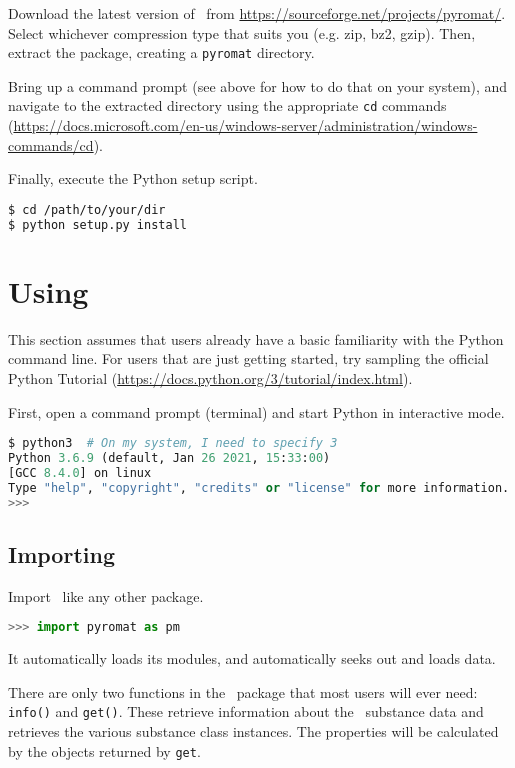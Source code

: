 Download the latest version of \PM\ from \url{https://sourceforge.net/projects/pyromat/}.  Select whichever compression type that suits you (e.g. zip, bz2, gzip).  Then, extract the package, creating a \texttt{pyromat} directory.

Bring up a command prompt (see above for how to do that on your system), and navigate to the extracted directory using the appropriate \texttt{cd} commands (\url{https://docs.microsoft.com/en-us/windows-server/administration/windows-commands/cd}).

Finally, execute the Python setup script.

\begin{lstlisting}[language=bash]
$ cd /path/to/your/dir
$ python setup.py install
\end{lstlisting}

\section{Using \PM }

This section assumes that users already have a basic familiarity with the Python command line.  For users that are just getting started, try sampling the official Python Tutorial (\url{https://docs.python.org/3/tutorial/index.html}).

First, open a command prompt (terminal) and start Python in interactive mode.
\begin{lstlisting}[language=Python]
$ python3  # On my system, I need to specify 3
Python 3.6.9 (default, Jan 26 2021, 15:33:00) 
[GCC 8.4.0] on linux
Type "help", "copyright", "credits" or "license" for more information.
>>> 
\end{lstlisting}

\subsection{Importing}

Import \PM\ like any other package.  
\begin{lstlisting}[language=Python]
>>> import pyromat as pm
\end{lstlisting}
It automatically loads its modules, and automatically seeks out and loads data.

There are only two functions in the \PM\ package that most users will ever need: \texttt{info()} and \texttt{get()}.  These retrieve information about the \PM\ substance data and retrieves the various substance class instances.  The properties will be calculated by the objects returned by \texttt{get}.

